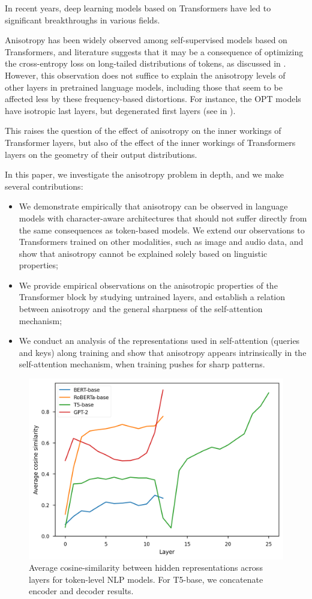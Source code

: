 In recent years, deep learning models based on Transformers have led to significant breakthroughs in various fields.

Anisotropy has been widely observed among self-supervised models based on Transformers, and literature suggests that it may be a consequence of optimizing the cross-entropy loss on long-tailed distributions of tokens, as discussed in . However, this observation does not suffice to explain the anisotropy levels of other layers in pretrained language models, including those that seem to be affected less by these frequency-based distortions. For instance, the OPT models \citep{zhang2022opt} have isotropic last layers, but degenerated first layers (see  in ).

This raises the question of the effect of anisotropy on the inner workings of Transformer layers, but also of the effect of the inner workings of Transformers layers on the geometry of their output distributions.


In this paper, we investigate the anisotropy problem in depth, and we make several contributions:
\begin{itemize}
    \item We demonstrate empirically that anisotropy can be observed in language models with character-aware architectures that should not suffer directly from the same consequences as token-based models. We extend our observations to Transformers trained on other modalities, such as image and audio data, and show that anisotropy cannot be explained solely based on linguistic properties;
    \item We provide empirical observations on the anisotropic properties of the Transformer block by studying untrained layers, and establish a relation between anisotropy and the general sharpness of the self-attention mechanism;
    \item We conduct an analysis of the representations used in self-attention (queries and keys) along training and show that anisotropy appears intrinsically in the self-attention mechanism, when training pushes for sharp patterns.
\end{itemize} 


\begin{figure}[ht]
    \centering
     \includegraphics[width=0.5\columnwidth]{sources/part_1/anisotropy/imgs/cosine_token.png}
     \caption{Average cosine-similarity between hidden representations across layers for token-level NLP models. For T5-base, we concatenate encoder and decoder results.}
     \label{fig:anisotropy_token}
\end{figure}

